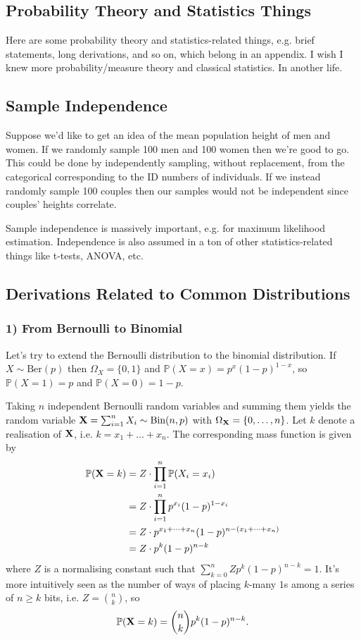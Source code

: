 \documentclass[11pt]{article}
\begin{document}
\newpage
\begin{appendices}

\section{Probability Theory and Statistics Things}
Here are some probability theory and statistics-related things, e.g. brief statements, long derivations, and so on, which belong in an appendix. I wish I knew more probability/measure theory and classical statistics. In another life.

\subsection{Sample Independence}
Suppose we'd like to get an idea of the mean population height of men and women. If we randomly sample 100 men and 100 women then we're good to go. This could be done by independently sampling, without replacement, from the categorical corresponding to the ID numbers of individuals. If we instead randomly sample 100 couples then our samples would not be independent since couples' heights correlate.

Sample independence is massively important, e.g. for maximum likelihood estimation. Independence is also assumed in a ton of other statistics-related things like t-tests, ANOVA, etc.

\subsection{Derivations Related to Common Distributions}

\subsubsection*{1) From Bernoulli to Binomial}
Let's try to extend the Bernoulli distribution to the binomial distribution. If $X\sim\text{Ber}(p)$ then $\Omega_X=\{0,1\}$ and $\mathbb{P}(X=x)=p^x(1-p)^{1-x}$, so $\mathbb{P}(X=1)=p$ and $\mathbb{P}(X=0)=1-p$.

Taking $n$ independent Bernoulli random variables and summing them yields the random variable $\mathbf{X}=\sum_{i=1}^nX_i\sim\text{Bin}(n,p)$ with $\Omega_{\mathbf{X}}=\{0,\dots,n\}$. Let $k$ denote a realisation of $\mathbf{X}$, i.e. $k=x_1+\dots+x_n$. The corresponding mass function is given by
\begin{align*}
    \mathbb{P}(\mathbf{X}=k)
    &=
    Z\cdot\prod_{i=1}^n\mathbb{P}(X_i=x_i)\\
    &=
    Z\cdot\prod_{i=1}^np^{x_i}(1-p)^{1-x_i}\\
    &=
    Z\cdot p^{x_1+\dots+x_n}(1-p)^{n-(x_1+\dots+x_n)}\\
    &=
    Z\cdot p^k(1-p)^{n-k}
\end{align*}
where $Z$ is a normalising constant such that $\sum_{k=0}^nZp^k(1-p)^{n-k}=1$. It's more intuitively seen as the number of ways of placing $k$-many $1$s among a series of $n\geq k$ bits, i.e. $Z=\binom{n}{k}$, so
$$
\mathbb{P}(\mathbf{X}=k)
=
\binom{n}{k}p^k(1-p)^{n-k}.
$$


\end{appendices}
\end{document}
